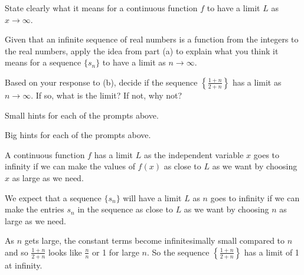 \begin{activity} \label{7.1.Act2}
\ba
\item State clearly what it means for a continuous function $f$ to have a limit $L$ as $x \to \infty$.

\item Given that an infinite sequence of real numbers is a function from the integers to the real numbers, apply the idea from part (a) to explain what you think it means for a sequence $\{s_n\}$ to have a limit as $n \to \infty$.  

\item Based on your response to (b), decide if the sequence $\left\{ \frac{1+n}{2+n}\right\}$ has a limit as $n \to \infty$. If so, what is the limit? If not, why not?

\ea
\end{activity}

\begin{smallhint}
\ba
	\item Small hints for each of the prompts above.
\ea
\end{smallhint}
\begin{bighint}
\ba
	\item Big hints for each of the prompts above.
\ea
\end{bighint}
\begin{activitySolution}
\ba
	\item A continuous function $f$ has a limit $L$ as the independent variable $x$ goes to infinity if we can make the values of $f(x)$ as close to $L$ as we want by choosing $x$ as large as we need. 
    \item We expect that a sequence $\{s_n\}$ will have a limit $L$ as $n$ goes to infinity if we can make the entries $s_n$ in the sequence as close to $L$ as we want by choosing $n$ as large as we need.
    \item As $n$ gets large, the constant terms become infinitesimally small compared to $n$ and so $\frac{1+n}{2+n}$ looks like $\frac{n}{n}$ or 1 for large $n$. So the sequence $\left\{ \frac{1+n}{2+n}\right\}$ has a limit of 1 at infinity.   
\ea
\end{activitySolution}
\aftera 
